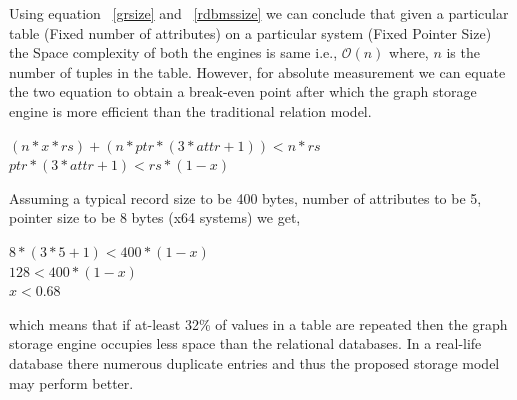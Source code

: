 \documentclass[12pt, oneside]{book}
\begin{document}
\par
Using equation ~\ref{grsize} and ~\ref{rdbmssize} we can conclude that given a particular table (Fixed number of attributes) on a particular system (Fixed Pointer Size) the Space complexity of both the engines is same i.e., $\mathcal{O}\left( n\right)$ where, $n$ is the number of tuples in the table. However, for absolute measurement we can equate the two equation to obtain a break-even point after which the graph storage engine is more efficient than the traditional relation model. 
\begin{center}
  \begin{math}
    (n * x * rs) + (n * ptr * (3 * attr + 1)) < n * rs
  \end{math}\\
  \begin{math}
    ptr * (3 * attr + 1) < rs * (1 - x)
  \end{math}
\end{center}
Assuming a typical record size to be 400 bytes, number of attributes to be 5, pointer size to be 8 bytes (x64 systems) we get,
\begin{center}
 \begin{math}
  8 * (3 * 5 + 1) < 400 * (1 - x)
 \end{math} \\
 \begin{math}
  128 < 400 * (1-x)
 \end{math} \\
 \begin{math}
  x < 0.68
 \end{math}
\end{center}
which means that if at-least 32\% of values in a table are repeated then the graph storage engine occupies less space than the relational databases. In a real-life database there numerous duplicate entries and thus the proposed storage model may perform better.
\end{document}
